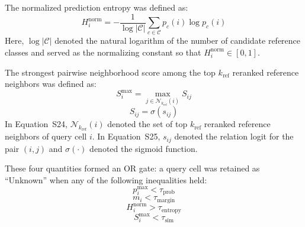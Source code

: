 \documentclass[11pt]{article}
\begin{document}
The normalized prediction entropy was defined as:
\begin{equation}
H_i^{\mathrm{norm}} = -\frac{1}{\log|\mathcal{C}|}\sum_{c \in \mathcal{C}} p_c(i) \log p_c(i)
\label{eq:supp_entropy}
\end{equation}
Here, \(\log|\mathcal{C}|\) denoted the natural logarithm of the number of candidate reference classes and served as the normalizing constant so that \(H_i^{\mathrm{norm}} \in [0,1]\).

The strongest pairwise neighborhood score among the top \(k_{\mathrm{ref}}\) reranked reference neighbors was defined as:
\begin{equation}
S_i^{\max} = \max_{j \in \mathcal{N}_{k_{\mathrm{ref}}}(i)} S_{ij}
\label{eq:supp_top1sim}
\end{equation}
\begin{equation}
S_{ij} = \sigma(s_{ij})
\label{eq:supp_pairscore}
\end{equation}
In Equation~S24, \(\mathcal{N}_{k_{\mathrm{ref}}}(i)\) denoted the set of top \(k_{\mathrm{ref}}\) reranked reference neighbors of query cell \(i\). In Equation~S25, \(s_{ij}\) denoted the relation logit for the pair \((i,j)\) and \(\sigma(\cdot)\) denoted the sigmoid function.

These four quantities formed an OR gate: a query cell was retained as ``Unknown'' when any of the following inequalities held:
\begin{equation}
p_i^{\max} < \tau_{\mathrm{prob}}
\label{eq:supp_gate_prob}
\end{equation}
\begin{equation}
m_i < \tau_{\mathrm{margin}}
\label{eq:supp_gate_margin}
\end{equation}
\begin{equation}
H_i^{\mathrm{norm}} > \tau_{\mathrm{entropy}}
\label{eq:supp_gate_entropy}
\end{equation}
\begin{equation}
S_i^{\max} < \tau_{\mathrm{sim}}
\label{eq:supp_gate_sim}
\end{equation}
\end{document}
